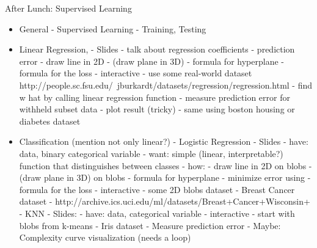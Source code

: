 \documentclass[english,final,compress]{beamer}
\begin{document}
\begin{frame}
    After Lunch: Supervised Learning
    \begin{itemize}
        \item General
            - Supervised Learning
            - Training, Testing
        \item Linear Regression, 
            - Slides
                - talk about regression coefficients
                - prediction error
                - draw line in 2D
                - (draw plane in 3D)
                - formula for hyperplane
                - formula for the loss
            - interactive
              - use some real-world dataset
                http://people.sc.fsu.edu/~jburkardt/datasets/regression/regression.html
              - find w hat by calling linear regression function
              - measure prediction error for withheld subset data
              - plot result (tricky)
              - same using boston housing or diabetes dataset
        \item Classification (mention not only linear?)
            - Logistic Regression
              - Slides
                - have: data, binary categorical variable
                - want: simple (linear, interpretable?) function that distinguishes between classes 
                - how:
                  - draw line in 2D on blobs
                  - (draw plane in 3D) on blobs
                  - formula for hyperplane
                  - minimize error using
                  - formula for the loss
              - interactive
                - some 2D blobs dataset
                - Breast Cancer dataset
                - http://archive.ics.uci.edu/ml/datasets/Breast+Cancer+Wisconsin+%
            - KNN
              - Slides:
                - have: data, categorical variable
              - interactive
                - start with blobs from k-means
                - Iris dataset
                - Measure prediction error
                - Maybe: Complexity curve visualization (needs a loop)
    \end{itemize}
\end{frame}
\end{document}
